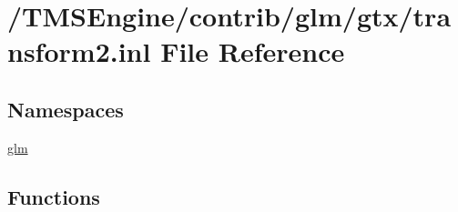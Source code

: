 \hypertarget{transform2_8inl}{}\section{/\+T\+M\+S\+Engine/contrib/glm/gtx/transform2.inl File Reference}
\label{transform2_8inl}
\subsection*{Namespaces}
\begin{DoxyCompactItemize}
\item 
 \hyperlink{namespaceglm}{glm}
\end{DoxyCompactItemize}
\subsection*{Functions}

